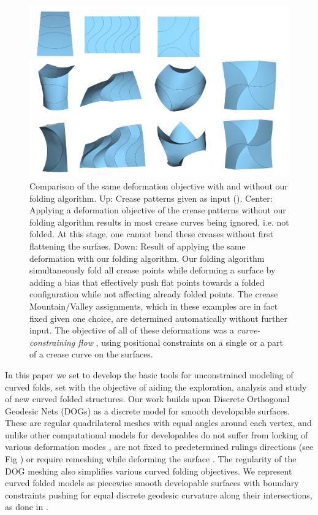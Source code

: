 \begin{figure} [h]
	\centering
	\includegraphics[width=\linewidth]{figures/fold_bias_compare}
	\caption{Comparison of the same deformation objective with and without our folding algorithm. Up: Crease patterns given as input (). Center: Applying a deformation objective of the crease patterns without our folding algorithm results in most crease curves being ignored, i.e. not folded. At this stage, one cannot bend these creases without first flattening the surfaes. Down: Result of applying the same deformation with our folding algorithm. Our folding algorithm simultaneously fold all crease points while deforming a surface by adding a bias that effectively push flat points towards a folded configuration while not affecting already folded points. The crease Mountain/Valley assignments, which in these examples are in fact fixed given one choice, are determined automatically without further input. The objective of all of these deformations was a  \textit{curve-constraining flow} \cite{rabi2018shape}, using positional constraints on a single or a part of a crease curve on the surfaces.}
	\label{fig:folded_and_not_folded}
\end{figure}

In this paper we set to develop the basic tools for unconstrained modeling of curved folds, set with the objective of aiding the exploration, analysis and study of new curved folded structures. Our work builds upon Discrete Orthogonal Geodesic Nets (DOGs) \cite{rabi18,rabi2018shape} as a discrete model for smooth developable surfaces. These are regular quadrilateral meshes with equal angles around each vertex, and unlike other computational models for developables do not suffer from locking of various deformation modes \cite{locking1,locking2,grin_shells}, are not fixed to predetermined rulings directions \cite{pottmann_new,curved_folding_kilian} (see Fig ) or require remeshing while deforming the surface \cite{StringActuated:2017,SchreckEG2017,Narain}. The regularity of the DOG meshing also simplifies various curved folding objectives. We represent curved folded models as piecewise smooth developable surfaces with boundary constraints pushing for equal discrete geodesic curvature along their intersections, as done in \cite{rabi2018shape}.

